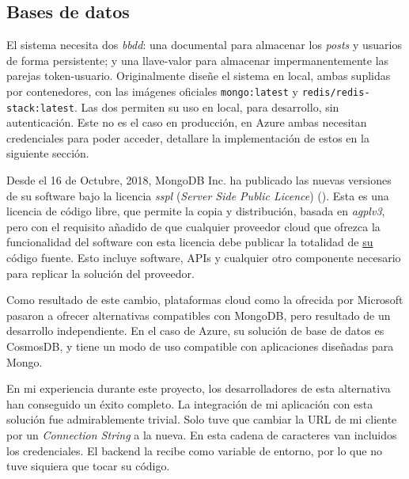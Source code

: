 \documentclass[11pt]{article}
\begin{document}
\begin{flushleft}
	\clearpage
	\subsection{Bases de datos}
	El sistema necesita dos \textit{\acrshort{bbdd}}: una documental para almacenar los \textit{posts} y usuarios de forma persistente; y una llave-valor para almacenar impermanentemente las parejas token-usuario. Originalmente diseñe el sistema en local, ambas suplidas por contenedores, con las imágenes oficiales \texttt{mongo:latest} y \texttt{redis/redis-stack:latest}. Las dos permiten su uso en local, para desarrollo, sin autenticación. Este no es el caso en producción, en Azure ambas necesitan credenciales para poder acceder, detallare la implementación de estos en la siguiente sección.
	\linebreak
	
	Desde el 16 de Octubre, 2018, MongoDB Inc. ha publicado las nuevas versiones de su software bajo la licencia \textit{\acrshort{sspl}} (\textit{Server Side Public Licence}) (\cite{mongo_sspl}). Esta es una licencia de código libre, que permite la copia y distribución, basada en \textit{\acrshort{agpl}v3}, pero con el requisito añadido de que cualquier proveedor cloud que ofrezca la funcionalidad del software con esta licencia debe publicar la totalidad de \underline{su} código fuente. Esto incluye software, APIs y cualquier otro componente necesario para replicar la solución del proveedor. 
	\linebreak
	
	Como resultado de este cambio, plataformas cloud como la ofrecida por Microsoft pasaron a ofrecer alternativas compatibles con MongoDB, pero resultado de un desarrollo independiente. En el caso de Azure, su solución de base de datos es CosmosDB, y tiene un modo de uso compatible con aplicaciones diseñadas para Mongo. 
	\linebreak
	
	En mi experiencia durante este proyecto, los desarrolladores de esta alternativa han conseguido un éxito completo. La integración de mi aplicación con esta solución fue admirablemente trivial. Solo tuve que cambiar la URL de mi cliente por un \textit{Connection String} a la nueva. En esta cadena de caracteres van incluidos los credenciales. El backend la recibe como variable de entorno, por lo que no tuve siquiera que tocar su código.
	\linebreak
	

\end{flushleft}
\end{document}
